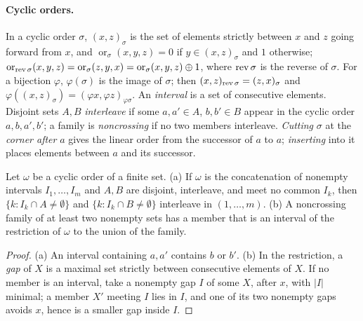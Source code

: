 \paragraph{Cyclic orders.}
In a cyclic order $\sigma$, $(x,z)_\sigma$ is the set of elements strictly
between $x$ and $z$ going forward from $x$, and
$\operatorname{or}_\sigma(x,y,z)=0$ if $y\in(x,z)_\sigma$ and $1$ otherwise;
$\operatorname{or}_{\operatorname{rev}\sigma}(x,y,z)=\operatorname{or}_\sigma(z,y,x)
=\operatorname{or}_\sigma(x,y,z)\oplus1$, where $\operatorname{rev}\sigma$ is the reverse
of $\sigma$. For a bijection $\varphi$, $\varphi(\sigma)$ is the image of
$\sigma$; then $(x,z)_{\operatorname{rev}\sigma}=(z,x)_\sigma$ and
$\varphi((x,z)_\sigma)=(\varphi x,\varphi z)_{\varphi\sigma}$. An \emph{interval} is a set of
consecutive elements. Disjoint sets $A,B$ \emph{interleave} if some
$a,a'\in A$, $b,b'\in B$ appear in the cyclic order $a,b,a',b'$; a family is
\emph{noncrossing} if no two members interleave. \emph{Cutting} $\sigma$ at the \emph{corner after} $a$ gives the
linear order from the successor of $a$ to $a$; \emph{inserting} into it
places elements between $a$ and its successor.

\begin{lemma}[intervals]\label{lem:v4-intervals}
Let $\omega$ be a cyclic order of a finite set.
(a) If $\omega$ is the concatenation of nonempty intervals $I_1,\dots,I_m$
and $A,B$ are disjoint, interleave, and meet no common $I_k$, then
$\{k:I_k\cap A\neq\emptyset\}$ and $\{k:I_k\cap B\neq\emptyset\}$
interleave in $(1,\dots,m)$. (b) A noncrossing family of at least two
nonempty sets has a member that is an interval of the restriction of
$\omega$ to the union of the family.
\end{lemma}

\begin{proof}
(a) An interval containing $a,a'$ contains $b$ or $b'$. (b) In the
restriction, a \emph{gap} of $X$ is a maximal set strictly between consecutive
elements of $X$. If no member is an interval, take a nonempty gap $I$ of some
$X$, after $x$, with $|I|$ minimal; a member $X'$ meeting $I$ lies in $I$, and
one of its two nonempty gaps avoids $x$, hence is a smaller gap inside $I$.
\end{proof}

